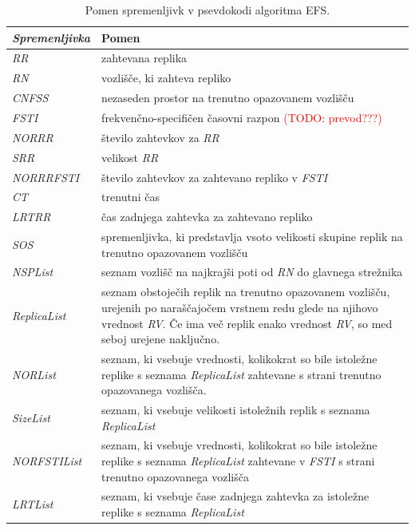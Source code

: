 \documentclass[a4paper, 12pt]{book}
\newcommand{\TODO}[1]{\textcolor{red}{(TODO: #1)}}
\begin{document}
\begin{table}
\small
  \begin{center}
    \begin{tabulary}{1.0\textwidth}{ >{\itshape}p{7em} J}
      \textnormal{Spremenljivka} & Pomen \\
      \hline
      RR & zahtevana replika \\
      RN &  vozlišče, ki zahteva repliko \\
      CNFSS & nezaseden prostor na trenutno opazovanem vozlišču \\
      FSTI & frekvenčno-specifičen časovni razpon \TODO{prevod???} \\
      NORRR & število zahtevkov za \textit{RR} \\
      SRR & velikost \textit{RR} \\
      NORRRFSTI & število zahtevkov za zahtevano repliko
          v \textit{FSTI} \\
      CT & trenutni čas \\
      LRTRR & čas zadnjega zahtevka za zahtevano repliko \\
      SOS & spremenljivka, ki predstavlja vsoto velikosti skupine replik na
          trenutno opazovanem vozlišču \\
      NSPList & seznam vozlišč na najkrajši poti od \textit{RN} do
          glavnega strežnika \\
      ReplicaList & seznam obstoječih replik na trenutno opazovanem vozlišču,
          urejenih po naraščajočem vrstnem redu glede na njihovo vrednost
          \textit{RV}. Če ima več replik enako vrednost \textit{RV}, so med
          seboj urejene naključno. \\
      NORList & seznam, ki vsebuje vrednosti, kolikokrat so bile istoležne
          replike s seznama \textit{ReplicaList} zahtevane s strani
          trenutno opazovanega vozlišča. \\
      SizeList & seznam, ki vsebuje velikosti istoležnih replik s seznama
          \textit{ReplicaList} \\
      NORFSTIList & seznam, ki vsebuje vrednosti, kolikokrat so bile istoležne
          replike s seznama \textit{ReplicaList} zahtevane v \textit{FSTI} s
          strani trenutno opazovanega vozlišča \\
      LRTList & seznam, ki vsebuje čase zadnjega zahtevka za istoležne
          replike s seznama \textit{ReplicaList}
    \end{tabulary}
 \end{center}

  \caption{Pomen spremenljivk v psevdokodi algoritma EFS.}
  \label{tbl:EFS_vars}
\end{table}
\end{document}
